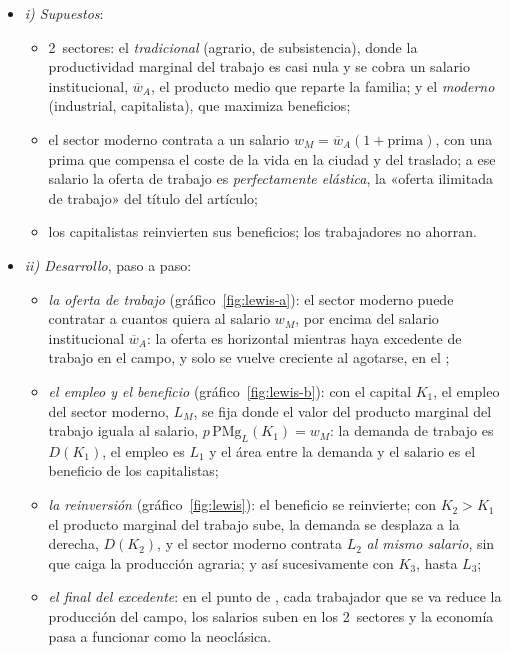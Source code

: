 \documentclass[11pt]{article}
\begin{document}
\begin{itemize}
\item \emph{i) Supuestos}:
  \begin{itemize}
  \item 2~sectores: el \emph{tradicional} (agrario, de subsistencia), donde la productividad marginal del trabajo es casi nula y se cobra un salario institucional, $\overline w_A$, el producto medio que reparte la familia; y el \emph{moderno} (industrial, capitalista), que maximiza beneficios;
  \item el sector moderno contrata a un salario $w_M=\overline w_A(1+\text{prima})$, con una prima que compensa el coste de la vida en la ciudad y del traslado; a ese salario la oferta de trabajo es \emph{perfectamente elástica}, la «oferta ilimitada de trabajo» del título del artículo;
  \item los capitalistas reinvierten sus beneficios; los trabajadores no ahorran.
  \end{itemize}
\item \emph{ii) Desarrollo}, paso a paso:
  \begin{itemize}
  \item \emph{la oferta de trabajo} (gráfico~\ref{fig:lewis-a}): el sector moderno puede contratar a cuantos quiera al salario $w_M$, por encima del salario institucional $\overline w_A$: la oferta es horizontal mientras haya excedente de trabajo en el campo, y solo se vuelve creciente al agotarse, en el ;
  \item \emph{el empleo y el beneficio} (gráfico~\ref{fig:lewis-b}): con el capital $K_1$, el empleo del sector moderno, $L_M$, se fija donde el valor del producto marginal del trabajo iguala al salario, $p\,\mathrm{PMg}_L(K_1)=w_M$: la demanda de trabajo es $D(K_1)$, el empleo es $L_1$ y el área entre la demanda y el salario es el beneficio de los capitalistas;
  \item \emph{la reinversión} (gráfico~\ref{fig:lewis}): el beneficio se reinvierte; con $K_2>K_1$ el producto marginal del trabajo sube, la demanda se desplaza a la derecha, $D(K_2)$, y el sector moderno contrata $L_2$ \emph{al mismo salario}, sin que caiga la producción agraria; y así sucesivamente con $K_3$, hasta $L_3$;
  \item \emph{el final del excedente}: en el punto de , cada trabajador que se va reduce la producción del campo, los salarios suben en los 2~sectores y la economía pasa a funcionar como la neoclásica.
  \end{itemize}


\end{itemize}
\end{document}
